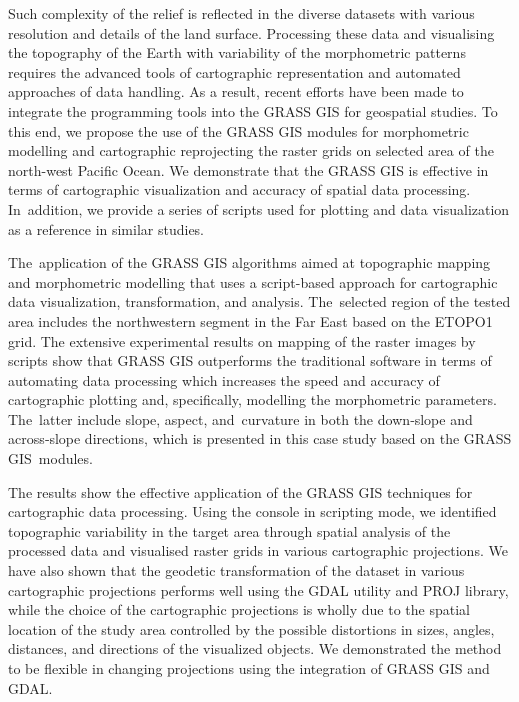 \documentclass[technologies,article,accept,pdftex,moreauthors]{Definitions/mdpi}
\begin{document}
Such complexity of the relief is reflected in the diverse datasets with various resolution and details of the land surface. Processing these data and visualising the topography of the Earth with variability of the morphometric patterns requires the advanced tools of cartographic representation and automated approaches of data handling. As a result, recent efforts have been made to integrate the programming tools into the GRASS GIS for geospatial studies. To this end, we propose the use of the GRASS GIS modules for morphometric modelling and cartographic reprojecting the raster grids on selected area of the north-west Pacific Ocean. We demonstrate that the GRASS GIS is effective in terms of cartographic visualization and accuracy of spatial data processing. In~addition, we provide a series of scripts used for plotting and data visualization as a reference in similar studies. 

The~application of the GRASS GIS algorithms {aimed at }topographic mapping and morphometric modelling that uses a script-based approach for cartographic data visualization, transformation, and analysis. The~selected region of the tested area includes the northwestern segment{ }in the Far East {based on the} ETOPO1 grid. {The }extensive experimental results on mapping {of the }raster images by scripts{ }show that GRASS GIS outperforms the traditional software in terms of automating data processing which increases the speed and accuracy of cartographic plotting{ and, specifically, modelling the morphometric parameters. The~latter include} slope, aspect, and~curvature in both the down‐slope and across‐slope directions, which is presented in this case study based on the GRASS GIS~modules. 

The results show the effective application of the GRASS GIS techniques for cartographic data processing. Using the console in scripting mode, we identified topographic variability in the target area through spatial analysis of the processed data and visualised raster grids in various cartographic projections. We have also shown that the geodetic transformation of the dataset in various cartographic projections performs well using the GDAL utility and PROJ library, while the choice of the cartographic projections is wholly due to the spatial location of the study area controlled by the possible distortions in sizes, angles, distances, and directions of the visualized objects. We demonstrated the method to be flexible in changing projections using the integration of GRASS GIS and GDAL. 
\end{document}
